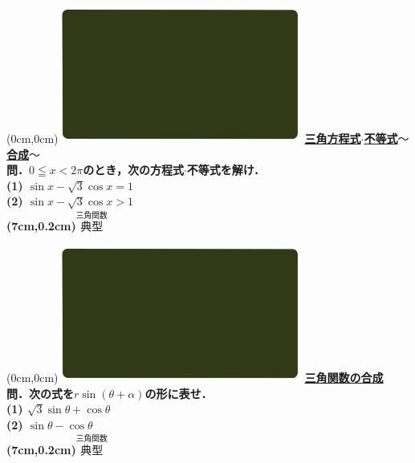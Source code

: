 \documentclass[10pt,
fleqn,
dvipdfmx,
uplatex
]{jsarticle}
\begin{document}
\newpage



\at(0cm,0cm){\includegraphics[width=8cm,bb=0 0 1920 1080]{./media_local/smart_background/三角関数.jpeg}}
{\color{orange}\bf\boldmath\Large\underline{三角方程式$\cdot$不等式$〜$合成$〜$}}\vspace{0.3zw}\\
\Large 
\bf\boldmath 問．$0\leqq x<2\pi$のとき，次の方程式$\cdot$不等式を解け．\\
(1)  $\sin x-\sqrt 3\cos x=1$\\
(2)  $\sin x-\sqrt 3\cos x>1$\\

\at(7cm,0.2cm){\small\color{bradorange}$\overset{\text{三角関数}}{\text{典型}}$}


\newpage



\at(0cm,0cm){\includegraphics[width=8cm,bb=0 0 1920 1080]{./media_local/smart_background/三角関数.jpeg}}
{\color{orange}\bf\boldmath\LARGE\underline{三角関数の合成}}\vspace{0.3zw}\\
\Large 
\bf\boldmath 問．次の式を$r\sin \left(\theta +\alpha \right)$の形に表せ．\\
(1)  $\sqrt 3\sin \theta +\cos \theta$\\
(2)  $\sin \theta -\cos \theta$\\

\at(7cm,0.2cm){\small\color{bradorange}$\overset{\text{三角関数}}{\text{典型}}$}


\newpage
\end{document}
